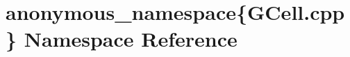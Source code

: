 \hypertarget{namespaceanonymous__namespace_02GCell_8cpp_03}{\section{anonymous\-\_\-namespace\{G\-Cell.\-cpp\} Namespace Reference}
\label{namespaceanonymous__namespace_02GCell_8cpp_03}
}
